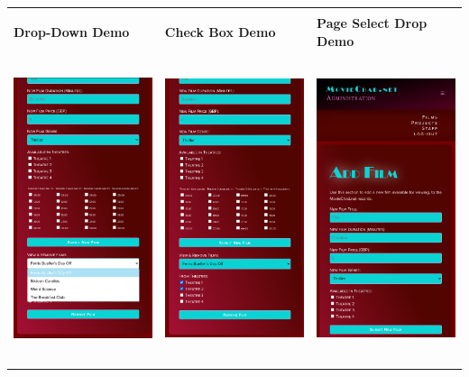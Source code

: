 \documentclass[11pt, english]{article}
\begin{document}
\begin{center}
\begin{longtable}{p{5cm}p{5cm}p{5cm}}
		& \\
                \textbf{Drop-Down Demo} & \textbf{Check Box Demo} & \textbf{Page Select Drop Demo}\\
		\includegraphics[width=5cm,height=9cm]{CS993_IMG/admin4.png} & \includegraphics[width=5cm,height=9cm]{CS993_IMG/admin5.png} & \includegraphics[width=5cm,height=9cm]{CS993_IMG/admin6.png}\\
        \end{longtable}
        \end{center}
\end{document}
